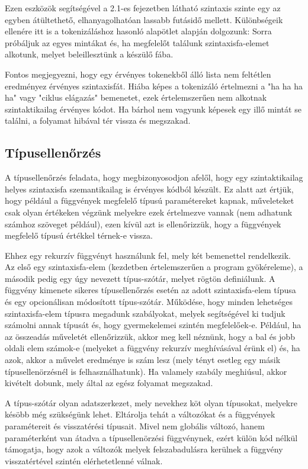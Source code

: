 Ezen eszközök segítségével a 2.1-es fejezetben látható szintaxis szinte egy az egyben átültethető, elhanyagolhatóan lassabb futásidő mellett. Különbségeik ellenére itt is a  tokenizáláshoz hasonló alapötlet alapján dolgozunk: Sorra próbáljuk az egyes mintákat és, ha megfelelőt találunk szintaxisfa-elemet alkotunk, melyet beleillesztünk a készülő fába.

Fontos megjegyezni, hogy egy érvényes tokenekből álló lista nem feltétlen eredményez érvényes szintaxisfát. Hiába képes a tokenizáló értelmezni a "ha ha ha ha" vagy "ciklus elágazás" bemenetet, ezek értelemszerűen nem alkotnak szintaktikailag érvényes kódot. Ha bárhol nem vagyunk képesek egy illő mintát se találni, a folyamat hibával tér vissza és megszakad.

\subsection{Típusellenőrzés}

A típusellenőrzés feladata, hogy megbizonyosodjon afelől, hogy egy szintaktikailag helyes szintaxisfa szemantikailag is érvényes kódból készült. Ez alatt azt értjük, hogy például a függvények megfelelő típusú paramétereket kapnak, műveleteket csak olyan értékeken végzünk melyekre ezek értelmezve vannak (nem adhatunk számhoz szöveget például), ezen kívül azt is ellenőrizzük, hogy a függvények megfelelő típusú értékkel térnek-e vissza.

Ehhez egy rekurzív függvényt használunk fel, mely két bemenettel rendelkezik. Az első egy szintaxisfa-elem (kezdetben értelemszerűen a program gyökéreleme), a második pedig egy úgy nevezett típus-szótár, melyet rögtön definiálunk. A függvény kimenete sikeres típusellenőrzés esetén az adott szintaxisfa-elem típusa és egy opcionálisan módosított típus-szótár. Működése, hogy minden lehetséges szintaxisfa-elem típusra megadunk szabályokat, melyek segítségével ki tudjuk számolni annak típusát és, hogy gyermekelemei szintén megfelelőek-e. Például, ha az összeadás műveletét ellenőrizzük, akkor meg kell néznünk, hogy a bal és jobb oldali elem számok-e (melyeket a függvény rekurzív meghívásával érünk el) és, ha azok, akkor a művelet eredménye is szám lesz (mely tényt esetleg egy másik típusellenörzésnél is felhasználhatunk). Ha valamely szabály meghiúsul, akkor kivételt dobunk, mely által az egész folyamat megszakad.

A típus-szótár olyan adatszerkezet, mely nevekhez köt olyan típusokat, melyekre késöbb még szükségünk lehet. Eltárolja tehát a változókat és a függvények paramétereit és visszatérési típusait. Mivel nem globális változó, hanem paraméterként van átadva a típusellenörzési függvénynek, ezért külön kód nélkül támogatja, hogy azok a változók melyek felszabadulásra kerülnek a függvény visszatértével szintén elérhetetlenné válnak.

